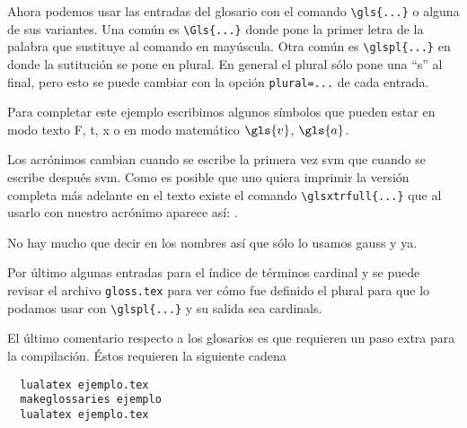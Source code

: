 Ahora podemos usar las entradas del glosario con el comando \verb|\gls{...}| o alguna de sus variantes. Una común es \verb|\Gls{...}| donde pone la primer letra de la palabra que sustituye al comando en mayúscula. Otra común es \verb|\glspl{...}| en donde la sutitución se pone en plural. En general el plural sólo pone una \enquote{s} al final, pero esto se puede cambiar con la opción \texttt{plural=...} de cada entrada.

Para completar este ejemplo escribimos algunos símbolos que pueden estar en modo texto \gls{F}, \gls{t}, \gls{x} o en modo matemático \(\gls{v}\), \(\gls{a}\).

Los acrónimos cambian cuando se escribe la primera vez \gls{svm} que cuando se escribe después \gls{svm}. Como es posible que uno quiera imprimir la versión completa más adelante en el texto existe el comando \verb|\glsxtrfull{...}| que al usarlo con nuestro acrónimo aparece así: .

No hay mucho que decir en los nombres así que sólo lo usamos \gls{gauss} y ya.

Por último algunas entradas para el índice de términos \gls{cardinal} y se puede revisar el archivo \texttt{gloss.tex} para ver cómo fue definido el plural para que lo podamos usar con \verb|\glspl{...}| y su salida sea \glspl{cardinal}.

El último comentario respecto a los glosarios es que requieren un paso extra para la compilación. Éstos requieren la siguiente cadena
\begin{verbatim}
  lualatex ejemplo.tex
  makeglossaries ejemplo
  lualatex ejemplo.tex
\end{verbatim}
